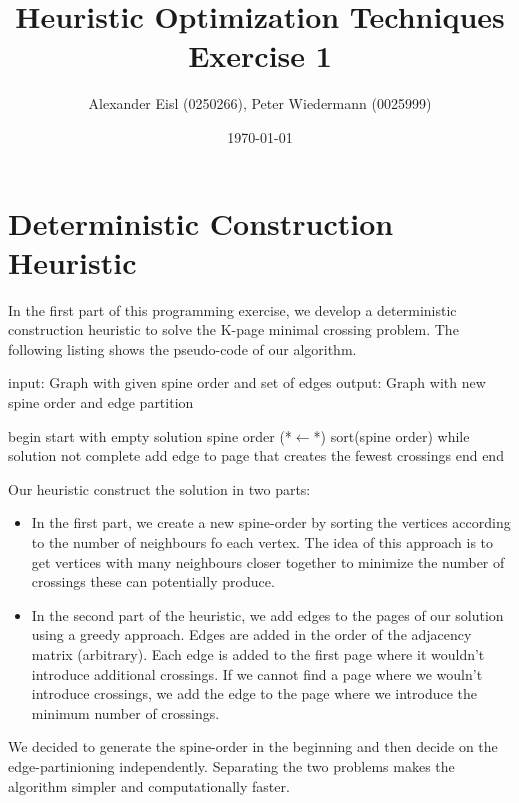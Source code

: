 \documentclass{scrartcl}
\author{Alexander Eisl (0250266), Peter Wiedermann (0025999)}
\date{\today}
\title{Heuristic Optimization Techniques \\ Exercise 1}
\begin{document}
\maketitle


\section{Deterministic Construction Heuristic}
\label{sec:deterministic}
In the first part of this programming exercise, we develop a
deterministic construction heuristic to solve the K-page minimal
crossing problem. The following listing shows the pseudo-code of our
algorithm.

\begin{algorithm}[caption={Deterministic construction heuristic}]
    input: Graph with given spine order and set of edges
    output: Graph with new spine order and edge partition

    begin
       start with empty solution
       spine order (*$\leftarrow$*) sort(spine order)
       while solution not complete
           add edge to page that creates the fewest crossings
       end 
    end
\end{algorithm}

Our heuristic construct the solution in two parts:

\begin{itemize}
\item In the first part,
we create a new spine-order by sorting the vertices according to the
number of neighbours fo each vertex. The idea of this approach is to
get vertices with many neighbours closer together to minimize the
number of crossings these can potentially produce.

\item In the second part of the heuristic, we add edges to the pages of our 
    solution using a greedy approach. Edges are added in the order of the adjacency matrix (arbitrary).
Each edge is added to the first page where it wouldn't introduce additional crossings.
If we cannot find a page where we wouln't introduce crossings, we add the edge to
the page where we introduce the minimum number of crossings.
\end{itemize}

We decided to generate the spine-order in the beginning and then
decide on the edge-partinioning independently. Separating the two
problems makes the algorithm simpler and computationally faster. 
\end{document}
